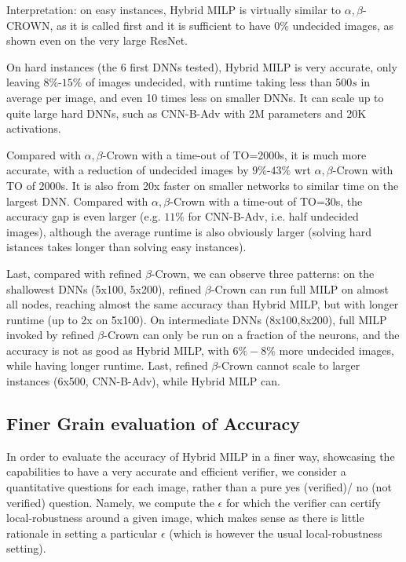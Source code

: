 Interpretation: on easy instances, Hybrid MILP is virtually similar to $\alpha,\beta$-CROWN, 
as it is called first and it is sufficient to have $0\%$ undecided images, as shown even on the very large ResNet.

On hard instances (the 6 first DNNs tested), Hybrid MILP is very accurate, only leaving $8\%$-$15\%$ of images undecided, with runtime taking less than $500s$ in average per image, and even 10 times less on smaller DNNs. It can scale up to quite large hard DNNs, such as CNN-B-Adv with 2M parameters and 20K activations.

Compared with $\alpha,\beta$-Crown with a time-out of TO=2000s, it is much more accurate, with a reduction of undecided images by $9\%$-$43\%$ wrt $\alpha,\beta$-Crown with TO of 2000s. It is also from 20x faster on smaller networks to similar time on the largest DNN.
Compared with $\alpha,\beta$-Crown with a time-out of TO=30s, the accuracy gap is even larger (e.g. $11\%$ for CNN-B-Adv, i.e. half undecided images), although the average runtime is also obviously larger (solving hard istances takes longer than solving easy instances).

Last, compared with refined $\beta$-Crown, we can observe three patterns: on the shallowest DNNs (5x100, 5x200), refined $\beta$-Crown can run full MILP on almost all nodes, reaching almost the same accuracy than  Hybrid MILP, but with longer runtime (up to 2x on 5x100). On intermediate DNNs (8x100,8x200), full MILP invoked by refined $\beta$-Crown can only be run on a fraction of the neurons, and the accuracy is not as good as Hybrid MILP, with $6\%-8\%$ more undecided images, while having longer runtime. Last, refined $\beta$-Crown cannot scale to larger instances (6x500, CNN-B-Adv), while Hybrid MILP can.


\subsection{Finer Grain evaluation of Accuracy}

In order to evaluate the accuracy of Hybrid MILP in a finer way, showcasing 
the capabilities to have a very accurate and efficient verifier, we consider
a quantitative questions for each image, rather than a pure yes (verified)/ no (not verified) question. Namely, we compute the $\epsilon$ for which the verifier can certify local-robustness around a given image, which makes sense as there is little rationale in setting a particular $\epsilon$ (which is however the usual local-robustness setting).

